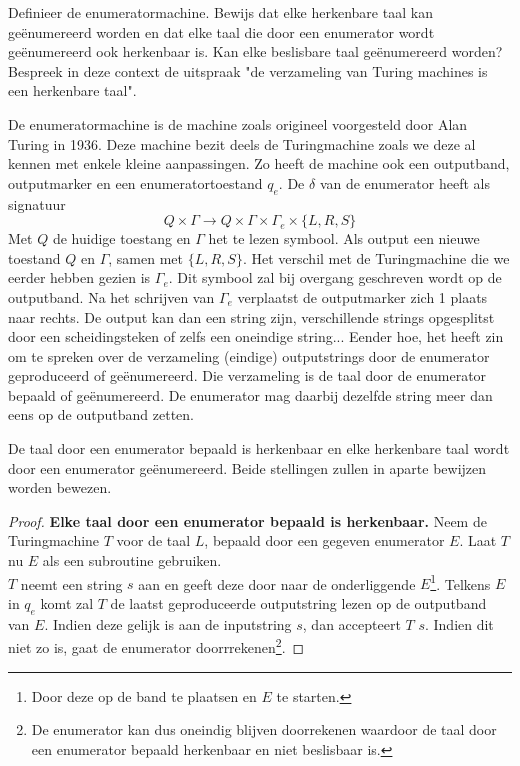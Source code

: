 \begin{question}
	Definieer de enumeratormachine. Bewijs dat elke herkenbare taal kan ge\"enumereerd worden en dat elke taal die door een enumerator wordt ge\"enumereerd ook herkenbaar is. Kan elke beslisbare taal ge\"enumereerd worden? Bespreek in deze context de uitspraak "de verzameling van Turing machines is een herkenbare taal".
\end{question}

De enumeratormachine is de machine zoals origineel voorgesteld door Alan Turing in 1936. Deze machine bezit deels de Turingmachine zoals we deze al kennen met enkele kleine aanpassingen. Zo heeft de machine ook een outputband, outputmarker en een enumeratortoestand $q_e$. De $\delta$ van de enumerator heeft als signatuur $$Q \times \Gamma \rightarrow Q \times \Gamma \times \Gamma_e \times \{L,R,S\}$$ Met $Q$ de huidige toestang en $\Gamma$ het te lezen symbool. Als output een nieuwe toestand $Q$ en $\Gamma$, samen met $\{L,R,S\}$. Het verschil met de Turingmachine die we eerder hebben gezien is $\Gamma_e$. Dit symbool zal bij overgang geschreven wordt op de outputband. Na het schrijven van $\Gamma_e$ verplaatst de outputmarker zich 1 plaats naar rechts. De output kan dan een string zijn, verschillende strings opgesplitst door een scheidingsteken  of zelfs een oneindige string... Eender hoe, het heeft zin om te spreken over de verzameling (eindige) outputstrings door de enumerator geproduceerd of ge\"enumereerd. Die verzameling is de taal door de enumerator bepaald of ge\"enumereerd. De enumerator mag daarbij dezelfde string meer dan eens op de outputband zetten.

\begin{theorem}
	De taal door een enumerator bepaald is herkenbaar en elke herkenbare taal wordt door een enumerator ge\"enumereerd. Beide stellingen zullen in aparte bewijzen worden bewezen.
\end{theorem}

\begin{proof}
	\textbf{Elke taal door een enumerator bepaald is herkenbaar.} Neem de Turingmachine $T$ voor de taal $L$, bepaald door een gegeven enumerator $E$. Laat $T$ nu $E$ als een subroutine gebruiken.\\
	$T$ neemt een string $s$ aan en geeft deze door naar de onderliggende $E$\footnote{Door deze op de band te plaatsen en $E$ te starten.}. Telkens $E$ in $q_e$ komt zal $T$ de laatst geproduceerde outputstring lezen op de outputband van $E$. Indien deze gelijk is aan de inputstring $s$, dan accepteert $T$ $s$. Indien dit niet zo is, gaat de enumerator doorrrekenen\footnote{De enumerator kan dus oneindig blijven doorrekenen waardoor de taal door een enumerator bepaald herkenbaar en niet beslisbaar is.}.
\end{proof}

